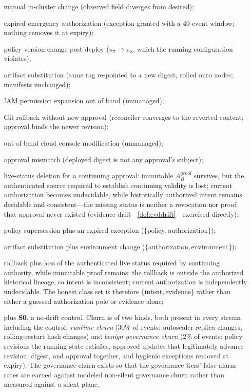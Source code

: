 \begin{description}[leftmargin=2.6em,itemsep=1pt,topsep=2pt]
\item[S1] manual in-cluster change (observed field diverges from desired);
\item[S2] expired emergency authorization (exception granted with a 40-event
window; nothing removes it at expiry);
\item[S3] policy version change post-deploy ($\pi_7 \to \pi_8$, which the
running configuration violates);
\item[S4] artifact substitution (same tag re-pointed to a new digest,
rolled onto nodes; manifests unchanged);
\item[S5] IAM permission expansion out of band (unmanaged);
\item[S6] Git rollback without new approval (reconciler converges to the
reverted content; approval binds the newer revision);
\item[S7] out-of-band cloud console modification (unmanaged);
\item[S8] approval mismatch (deployed digest is not any approval's subject);
\item[S9] live-status deletion for a continuing approval: immutable
$A_B^{\mathrm{proof}}$ survives, but the authenticated source required to
establish continuing validity is lost; current authorization becomes
undecidable, while historically authorized intent remains decidable and
consistent---the missing status is neither a revocation nor proof that approval never existed
(evidence drift---\cref{def:evddrift}---exercised directly);
\item[S10] policy supersession plus an expired exception
($\{\text{policy},\text{authorization}\}$);
\item[S11] artifact substitution plus environment change
($\{\text{authorization},\text{environment}\}$);
\item[S12] rollback plus loss of the authenticated live status required by
continuing authority, while immutable proof remains: the rollback is outside
the authorized historical lineage, so intent is inconsistent; current
authorization is independently undecidable. The honest class set is therefore
$\{\text{intent},\text{evidence}\}$ rather than either a guessed authorization
pole or evidence alone;
\end{description}
plus \textbf{S0}, a no-drift control. Churn is of two kinds, both present in
every stream including the control: \emph{runtime churn} (30\% of events:
autoscaler replica changes, rolling-restart hash changes) and \emph{benign
governance churn} (2\% of events: policy revisions the running state
satisfies, approved updates that legitimately advance revision, digest, and
approval together, and hygienic exceptions removed at expiry). The governance
churn exists so that the governance tiers' false-alarm rates are earned
against modeled non-silent governance churn rather than measured against a silent
plane.

